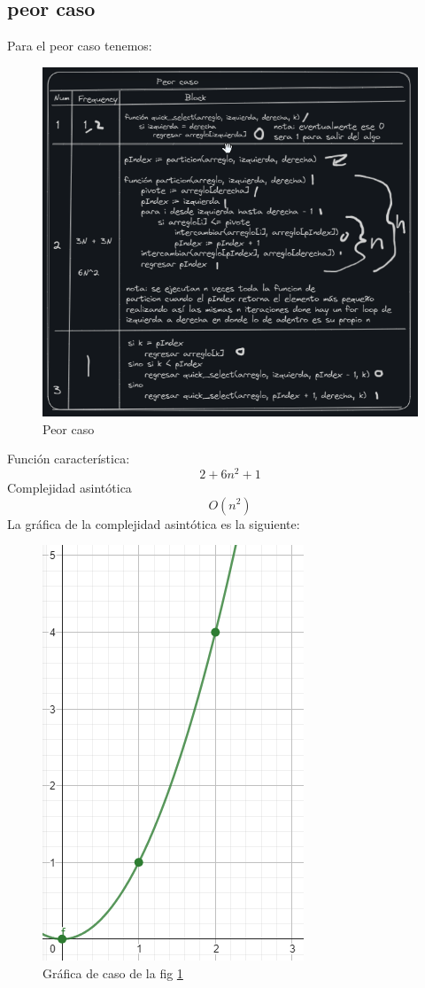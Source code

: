 \documentclass{article}
\begin{document}
\subsection*{peor caso}
Para el peor caso tenemos:
\begin{figure}[H]
  \centering
  \includegraphics[scale=0.8]{../imgs/q3.png}
  \caption{Peor caso}
  \label{Fig:3}
\end{figure}

  Función característica: 
  \begin{equation*}
    2 + 6n^2 + 1 
  \end{equation*}
  Complejidad asintótica
  \begin{equation*}
    O(n^2) 
  \end{equation*}
  La gráfica de la complejidad asintótica es la siguiente: 
  \begin{figure}[H]
    \centering
    \includegraphics[scale=0.8]{../imgs/q5.png}
    \caption{Gráfica de caso de la fig \ref{Fig:3}}
    \label{Fig:4}
  \end{figure}
\end{document}
